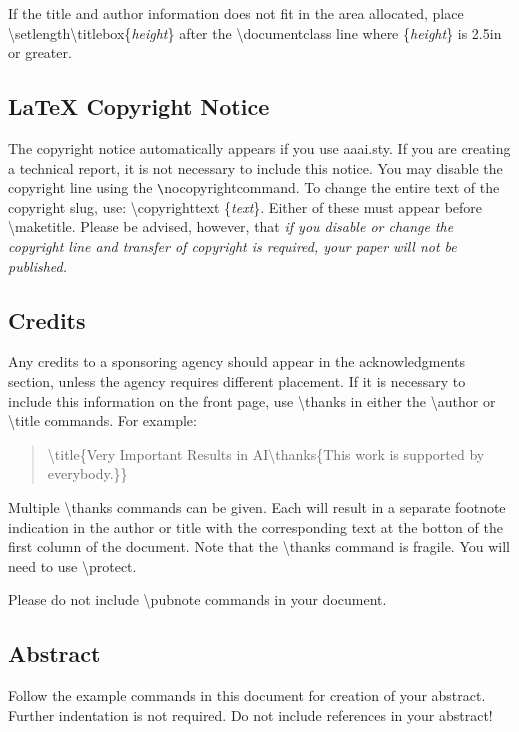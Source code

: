 \documentclass[letterpaper]{article}
\begin{document}
\noindent If the title and author information does not fit in the area allocated, place
\textbackslash setlength\textbackslash titlebox\{\textit{height}\}
after the \textbackslash documentclass line where \{\textit{height}\} is  2.5in or greater.

\subsection{\LaTeX{} Copyright Notice}
The copyright notice automatically appears if you use aaai.sty. If you are creating a technical report, it is not necessary to include this notice. You may disable the copyright line using the \verb+\+nocopyrightcommand. To change the entire text of the copyright slug, use:
\textbackslash copyrighttext \{\emph{text}\}.
Either of these must appear before \textbackslash maketitle. Please be advised, however, that \textit{if you disable or change the copyright line and transfer of copyright is required, your paper will not be published.}

\subsection{Credits}
Any credits to a sponsoring agency should appear in the acknowledgments section, unless the agency requires different placement. If it is necessary to include this information on the front page, use
\textbackslash thanks in either the \textbackslash author or \textbackslash title commands.
For example:
\begin{quote}
\begin{small}
\textbackslash title\{Very Important Results in AI\textbackslash thanks\{This work is
 supported by everybody.\}\}
\end{small}
\end{quote}
Multiple \textbackslash thanks commands can be given. Each will result in a separate footnote indication in the author or title with the corresponding text at the botton of the first column of the document. Note that the \textbackslash thanks command is fragile. You will need to use \textbackslash protect.

Please do not include \textbackslash pubnote commands in your document.

\subsection{Abstract}
Follow the example commands in this document for creation of your abstract. Further indentation is not required. {Do not include references in your abstract!}
\end{document}

